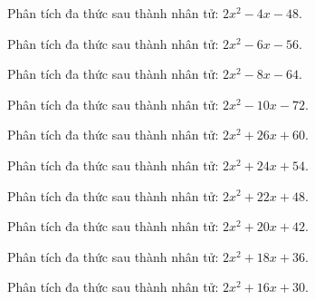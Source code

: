 \begin{bt}
	Phân tích đa thức sau thành nhân tử: $2 x^2 - 4 x - 48$.
\end{bt}
\begin{bt}
	Phân tích đa thức sau thành nhân tử: $2 x^2 - 6 x - 56$.
\end{bt}
\begin{bt}
	Phân tích đa thức sau thành nhân tử: $2 x^2 - 8 x - 64$.
\end{bt}
\begin{bt}
	Phân tích đa thức sau thành nhân tử: $2 x^2 - 10 x - 72$.
\end{bt}
\begin{bt}
	Phân tích đa thức sau thành nhân tử: $2 x^2 + 26 x + 60$.
\end{bt}
\begin{bt}
	Phân tích đa thức sau thành nhân tử: $2 x^2 + 24 x + 54$.
\end{bt}
\begin{bt}
	Phân tích đa thức sau thành nhân tử: $2 x^2 + 22 x + 48$.
\end{bt}
\begin{bt}
	Phân tích đa thức sau thành nhân tử: $2 x^2 + 20 x + 42$.
\end{bt}
\begin{bt}
	Phân tích đa thức sau thành nhân tử: $2 x^2 + 18 x + 36$.
\end{bt}
\begin{bt}
	Phân tích đa thức sau thành nhân tử: $2 x^2 + 16 x + 30$.
\end{bt}
